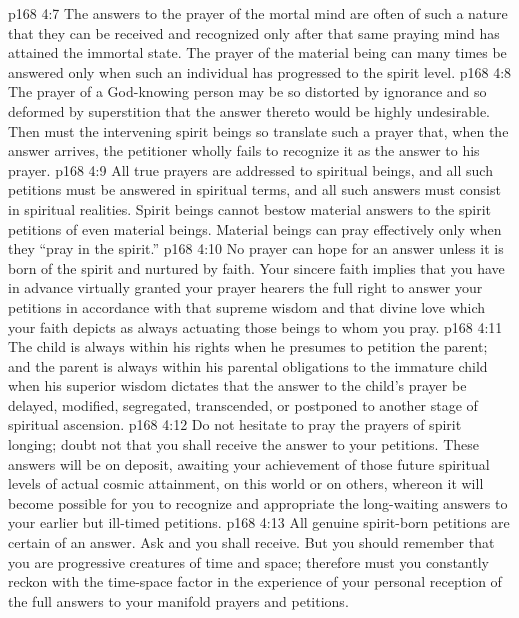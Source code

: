 \vs p168 4:7 \bibnobreakspace The answers to the prayer of the mortal mind are often of such a nature that they can be received and recognized only after that same praying mind has attained the immortal state. The prayer of the material being can many times be answered only when such an individual has progressed to the spirit level.
\vs p168 4:8 \bibnobreakspace The prayer of a God\hyp{}knowing person may be so distorted by ignorance and so deformed by superstition that the answer thereto would be highly undesirable. Then must the intervening spirit beings so translate such a prayer that, when the answer arrives, the petitioner wholly fails to recognize it as the answer to his prayer.
\vs p168 4:9 \bibnobreakspace All true prayers are addressed to spiritual beings, and all such petitions must be answered in spiritual terms, and all such answers must consist in spiritual realities. Spirit beings cannot bestow material answers to the spirit petitions of even material beings. Material beings can pray effectively only when they “pray in the spirit.”
\vs p168 4:10 \bibnobreakspace No prayer can hope for an answer unless it is born of the spirit and nurtured by faith. Your sincere faith implies that you have in advance virtually granted your prayer hearers the full right to answer your petitions in accordance with that supreme wisdom and that divine love which your faith depicts as always actuating those beings to whom you pray.
\vs p168 4:11 \bibnobreakspace The child is always within his rights when he presumes to petition the parent; and the parent is always within his parental obligations to the immature child when his superior wisdom dictates that the answer to the child’s prayer be delayed, modified, segregated, transcended, or postponed to another stage of spiritual ascension.
\vs p168 4:12 \bibnobreakspace Do not hesitate to pray the prayers of spirit longing; doubt not that you shall receive the answer to your petitions. These answers will be on deposit, awaiting your achievement of those future spiritual levels of actual cosmic attainment, on this world or on others, whereon it will become possible for you to recognize and appropriate the long\hyp{}waiting answers to your earlier but ill\hyp{}timed petitions.
\vs p168 4:13 \bibnobreakspace All genuine spirit\hyp{}born petitions are certain of an answer. Ask and you shall receive. But you should remember that you are progressive creatures of time and space; therefore must you constantly reckon with the time\hyp{}space factor in the experience of your personal reception of the full answers to your manifold prayers and petitions.
